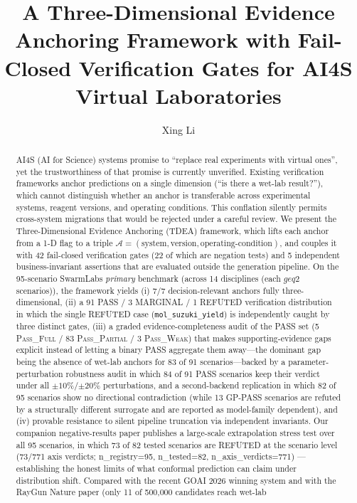 \documentclass[review,3p]{elsarticle}
\begin{document}
\begin{frontmatter}

\title{A Three-Dimensional Evidence Anchoring Framework with Fail-Closed Verification Gates for AI4S Virtual Laboratories}

\author[swarm]{Xing Li}



\begin{abstract}
AI4S (AI for Science) systems promise to ``replace real experiments with virtual ones'', yet the trustworthiness of that promise is currently unverified. Existing verification frameworks anchor predictions on a single dimension (``is there a wet-lab result?''), which cannot distinguish whether an anchor is transferable across experimental systems, reagent versions, and operating conditions. This conflation silently permits cross-system migrations that would be rejected under a careful review. We present the Three-Dimensional Evidence Anchoring (TDEA) framework, which lifts each anchor from a 1-D flag to a triple $\mathcal{A} = (\text{system}, \text{version}, \text{operating-condition})$, and couples it with 42 fail-closed verification gates (22 of which are negation tests) and 5 independent business-invariant assertions that are evaluated outside the generation pipeline. On the 95-scenario SwarmLabs \emph{primary} benchmark (across 14 disciplines (each $geq 2$ scenarios)), the framework yields (i) 7/7 decision-relevant anchors fully three-dimensional, (ii) a 91 PASS / 3 MARGINAL / 1 REFUTED verification distribution in which the single REFUTED case (\texttt{mol\_suzuki\_yield}) is independently caught by three distinct gates, (iii) a graded evidence-completeness audit of the PASS set (5 \textsc{Pass\_Full} / 83 \textsc{Pass\_Partial} / 3 \textsc{Pass\_Weak}) that makes supporting-evidence gaps explicit instead of letting a binary PASS aggregate them away---the dominant gap being the absence of wet-lab anchors for 83 of 91 scenarios---backed by a parameter-perturbation robustness audit in which 84 of 91 PASS scenarios keep their verdict under all $\pm10\%$/$\pm20\%$ perturbations, and a second-backend replication in which 82 of 95 scenarios show no directional contradiction (while 13 GP-PASS scenarios are refuted by a structurally different surrogate and are reported as model-family dependent), and (iv) provable resistance to silent pipeline truncation via independent invariants. Our companion negative-results paper publishes a large-scale extrapolation stress test over all 95 scenarios, in which 73 of 82 tested scenarios are REFUTED at the scenario level (73/771 axis verdicts; n_registry=95, n_tested=82, n_axis_verdicts=771) — establishing the honest limits of what conformal prediction can claim under distribution shift. Compared with the recent GOAI 2026 winning system and with the RayGun Nature paper (only 11 of 500{,}000 candidates reach wet-lab 
\end{abstract}
\end{frontmatter}
\end{document}
